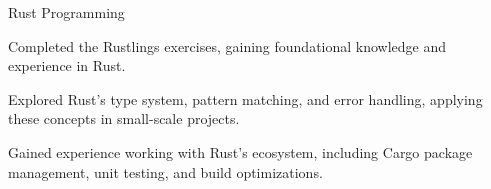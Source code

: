 \begin{cventries}
  \cventry
    {Rust Programming} %
    {} %
    {} %
    {} %
    {
      \begin{cvitems}
        \item {Completed the Rustlings exercises, gaining foundational knowledge and experience in Rust.}
        \item {Explored Rust’s type system, pattern matching, and error handling, applying these concepts in small-scale projects.}
        \item {Gained experience working with Rust’s ecosystem, including Cargo package management, unit testing, and build optimizations.}
      \end{cvitems}
    }


\end{cventries}
